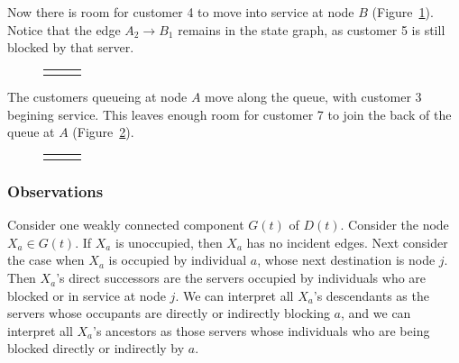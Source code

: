 \documentclass{article}
\begin{document}
Now there is room for customer 4 to move into service at node $B$ (Figure~\ref{fig:general_builddown_3}).
Notice that the edge $A_2 \longrightarrow B_1$ remains in the state graph, as customer 5 is still blocked by that server.

\begin{figure}[H]
  \begin{center}
    \begin{tabular}{ c c c }
       & \hspace{0.1\textwidth} &
       \\
  \end{tabular}
  \end{center}
  \caption{}
  \label{fig:general_builddown_3}
\end{figure}

The customers queueing at node $A$ move along the queue, with customer 3 begining service.
This leaves enough room for customer 7 to join the back of the queue at $A$ (Figure~\ref{fig:general_builddown_4}).

\begin{figure}[H]
  \begin{center}
    \begin{tabular}{ c c c }
       & \hspace{0.1\textwidth} &
       \\
  \end{tabular}
  \end{center}
  \caption{}
  \label{fig:general_builddown_4}
\end{figure}

\subsubsection{Observations}

Consider one weakly connected component $G(t)$ of $D(t)$.
Consider the node $X_a \in G(t)$. If $X_a$ is unoccupied, then $X_a$ has no incident edges.
Next consider the case when $X_a$ is occupied by individual $a$, whose next destination is node $j$.
Then $X_a$'s direct successors are the servers occupied by individuals who are blocked or in service at node $j$.
We can interpret all $X_a$'s descendants as the servers whose occupants are directly or indirectly blocking $a$, and we can interpret all $X_a$'s ancestors as those servers whose individuals who are being blocked directly or indirectly by $a$.
\end{document}
